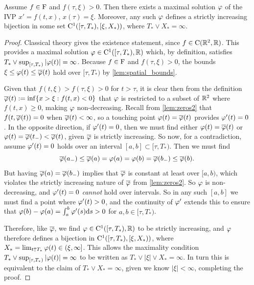 \begin{theorem}\label{thm:bijectivity_new}
    Assume $f\in\mathrm{F}$ and $f(\tau,\xi)>0$. Then there exists a maximal solution $\varphi$ of the IVP $x'=f(t,x)$, $x(\tau)=\xi$. Moreover, any such $\varphi$ defines a strictly increasing bijection in some set $\mathrm{C}^1([\tau,T_*),[\xi,X_*))$, where $T_*\vee X_*=\infty$.
\end{theorem}
\begin{proof}
    Classical theory gives the existence statement, since $f\in\mathrm{C}(\mathbb{R}^2,\mathbb{R})$. This provides a maximal solution $\varphi\in\mathrm{C}^1([\tau,T_*),\mathbb{R})$ which, by definition, satisfies $T_*\vee\sup_{[\tau,T_*)}|\varphi(t)|=\infty$. Because $f\in\mathrm{F}$ and $f(\tau,\xi)>0$, the bounds $\xi\le\varphi(t)\le\overline{\varphi}(t)$ hold over $[\tau,T_*)$ by \autoref{lem:spatial_bounds}.

    Given that $f(t,\xi)>f(\tau,\xi)>0$ for $t>\tau$, it is clear then from the definition $\overline{\varphi}(t) := \inf\{x>\xi:f(t,x)<0\}$ that $\varphi$ is restricted to a subset of $\mathbb{R}^2$ where $f(t,x)\ge0$, making $\varphi$ non-decreasing. Recall from \autoref{lem:zeros2} that $f(t,\overline{\varphi}(t))=0$ when $\overline{\varphi}(t)<\infty$, so a touching point $\varphi(t)=\overline{\varphi}(t)$ provides $\varphi'(t)=0$. In the opposite direction, if $\varphi'(t)=0$, then we must find either $\varphi(t)=\overline{\varphi}(t)$ or $\varphi(t)=\overline{\varphi}(t_-)<\overline{\varphi}(t)$, given $\overline{\varphi}$ is strictly increasing. So now, for a contradiction, assume $\varphi'(t)=0$ holds over an interval $[a,b]\subset[\tau,T_*)$. Then we must find
    \begin{equation}
        \overline{\varphi}(a_-)\le\overline{\varphi}(a) = \varphi(a) = \varphi(b) = \overline{\varphi}(b_-) \le \overline{\varphi}(b).
    \end{equation}
    But having $\overline{\varphi}(a)=\overline{\varphi}(b_-)$ implies that $\overline{\varphi}$ is constant at least over $[a,b)$, which violates the strictly increasing nature of $\overline{\varphi}$ from \autoref{lem:zeros2}. So $\varphi$ is non-decreasing, and $\varphi'(t)=0$ \emph{cannot} hold over intervals. So in any such $[a,b]$ we must find a point where $\varphi'(t)>0$, and the continuity of $\varphi'$ extends this to ensure that $\varphi(b)-\varphi(a)=\int_a^b\varphi'(s)\mathrm{d} s>0$ for $a,b\in[\tau,T_*)$.

    Therefore, like $\overline{\varphi}$, we find $\varphi\in\mathrm{C}^1([\tau,T_*),\mathbb{R})$ to be strictly increasing, and $\varphi$ therefore defines a bijection in $\mathrm{C}^1([\tau,T_*),[\xi,X_*))$, where $X_*=\lim_{t\uparrow T_*}\varphi(t)\in(\xi,\infty]$. This allows the maximality condition $T_*\vee\sup_{[\tau,T_*)}|\varphi(t)|=\infty$ to be written as $T_*\vee|\xi|\vee X_*=\infty$. In turn this is equivalent to the claim of $T_*\vee X_*=\infty$, given we know $|\xi|<\infty$, completing the proof.
\end{proof}

